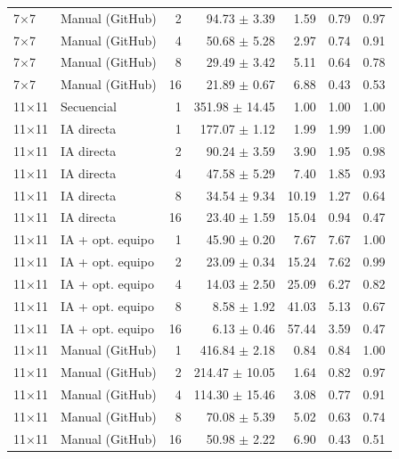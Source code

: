 \begin{tabular}{llrrrrr}
7$\times$7 & Manual (GitHub) & 2 & 94.73 $\pm$ 3.39 & 1.59 & 0.79 & 0.97 \\
7$\times$7 & Manual (GitHub) & 4 & 50.68 $\pm$ 5.28 & 2.97 & 0.74 & 0.91 \\
7$\times$7 & Manual (GitHub) & 8 & 29.49 $\pm$ 3.42 & 5.11 & 0.64 & 0.78 \\
7$\times$7 & Manual (GitHub) & 16 & 21.89 $\pm$ 0.67 & 6.88 & 0.43 & 0.53 \\
\midrule
11$\times$11 & Secuencial & 1 & 351.98 $\pm$ 14.45 & 1.00 & 1.00 & 1.00 \\
11$\times$11 & IA directa & 1 & 177.07 $\pm$ 1.12 & 1.99 & 1.99 & 1.00 \\
11$\times$11 & IA directa & 2 & 90.24 $\pm$ 3.59 & 3.90 & 1.95 & 0.98 \\
11$\times$11 & IA directa & 4 & 47.58 $\pm$ 5.29 & 7.40 & 1.85 & 0.93 \\
11$\times$11 & IA directa & 8 & 34.54 $\pm$ 9.34 & 10.19 & 1.27 & 0.64 \\
11$\times$11 & IA directa & 16 & 23.40 $\pm$ 1.59 & 15.04 & 0.94 & 0.47 \\
11$\times$11 & IA + opt. equipo & 1 & 45.90 $\pm$ 0.20 & 7.67 & 7.67 & 1.00 \\
11$\times$11 & IA + opt. equipo & 2 & 23.09 $\pm$ 0.34 & 15.24 & 7.62 & 0.99 \\
11$\times$11 & IA + opt. equipo & 4 & 14.03 $\pm$ 2.50 & 25.09 & 6.27 & 0.82 \\
11$\times$11 & IA + opt. equipo & 8 & 8.58 $\pm$ 1.92 & 41.03 & 5.13 & 0.67 \\
11$\times$11 & IA + opt. equipo & 16 & 6.13 $\pm$ 0.46 & 57.44 & 3.59 & 0.47 \\
11$\times$11 & Manual (GitHub) & 1 & 416.84 $\pm$ 2.18 & 0.84 & 0.84 & 1.00 \\
11$\times$11 & Manual (GitHub) & 2 & 214.47 $\pm$ 10.05 & 1.64 & 0.82 & 0.97 \\
11$\times$11 & Manual (GitHub) & 4 & 114.30 $\pm$ 15.46 & 3.08 & 0.77 & 0.91 \\
11$\times$11 & Manual (GitHub) & 8 & 70.08 $\pm$ 5.39 & 5.02 & 0.63 & 0.74 \\
11$\times$11 & Manual (GitHub) & 16 & 50.98 $\pm$ 2.22 & 6.90 & 0.43 & 0.51 \\
\bottomrule
\end{tabular}
